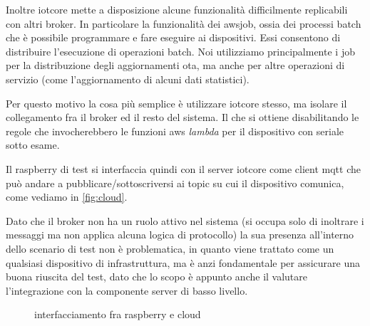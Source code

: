 \documentclass[12pt,a4paper,twoside,titlepage]{book}
\begin{document}
Inoltre \Gls{iotcore} mette a disposizione alcune funzionalità difficilmente replicabili con
altri \gls{broker}. In particolare la funzionalità dei \Gls{awsjob}, ossia dei processi batch che è
possibile programmare e fare eseguire ai dispositivi. Essi consentono di distribuire l'esecuzione
di operazioni batch. Noi utilizziamo principalmente i job per la distribuzione degli aggiornamenti \acrshort{ota},
ma anche per altre operazioni di servizio (come l'aggiornamento di alcuni dati statistici).

Per questo motivo la cosa più semplice è utilizzare \Gls{iotcore} stesso, ma isolare il collegamento
fra il \gls{broker} ed il resto del sistema. Il che si ottiene disabilitando le regole che invocherebbero 
le funzioni \acrshort{aws} \textit{lambda} per il dispositivo con seriale sotto esame. 

Il raspberry di test si interfaccia quindi con il server \Gls{iotcore} come client \Gls{mqtt} che può
andare a pubblicare/sottoscriversi ai \gls{topic} su cui il dispositivo comunica, come vediamo in \autoref{fig:cloud}.

Dato che il broker non ha un ruolo attivo nel sistema (si occupa solo di inoltrare i messaggi ma non
applica alcuna logica di protocollo) la sua presenza all'interno dello scenario di test non
è problematica, in quanto viene trattato come un qualsiasi dispositivo di infrastruttura, ma è anzi fondamentale 
per assicurare una buona riuscita del test, dato che lo scopo è appunto anche il valutare l'integrazione con la 
componente server di basso livello. 

\begin{figure}[h]
    \centering
    \caption{interfacciamento fra raspberry e cloud}
    \label{fig:cloud}
\end{figure}
\end{document}
